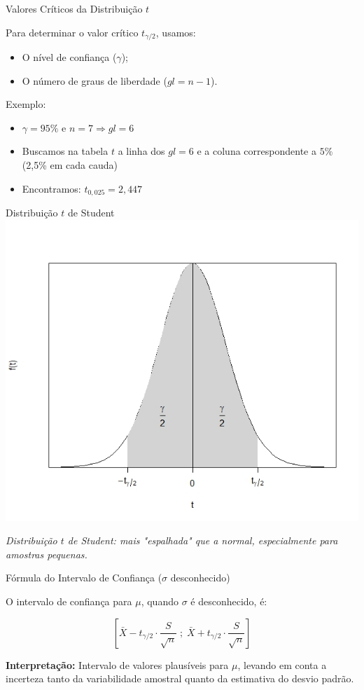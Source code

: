 \documentclass[14pt,aspectratio=1610]{beamer}
\begin{document}
\begin{frame}{Valores Críticos da Distribuição $t$}
	\begin{block}{}
		\justifying
		Para determinar o valor crítico $t_{\gamma/2}$, usamos:
		\begin{itemize}
			\item O nível de confiança ($\gamma$);
			\item O número de graus de liberdade ($gl = n - 1$).
		\end{itemize}
		
		Exemplo:
		\begin{itemize}
			\item $\gamma = 95\%$ e $n = 7 \Rightarrow gl = 6$
			\item Buscamos na tabela $t$ a linha dos $gl = 6$ e a coluna correspondente a $5\%$ (2,5\% em cada cauda)
			\item Encontramos: $t_{0,025} = 2,447$
		\end{itemize}
	\end{block}
\end{frame}

\begin{frame}{Distribuição $t$ de Student}
	\centering
	\includegraphics[width=0.5\linewidth]{figs/ICtStudent.jpeg}
	
	\vspace{-0.3cm}
	\small\textit{Distribuição $t$ de Student: mais "espalhada" que a normal, especialmente para amostras pequenas.}
\end{frame}

\begin{frame}{Fórmula do Intervalo de Confiança ($\sigma$ desconhecido)}
	\begin{block}{}
		\justifying
		O intervalo de confiança para $\mu$, quando $\sigma$ é desconhecido, é:
		
		\[
		\left[ \bar{X} - t_{\gamma/2} \cdot \frac{S}{\sqrt{n}} \; ; \;
		\bar{X} + t_{\gamma/2} \cdot \frac{S}{\sqrt{n}} \right]
		\]
		
		\textbf{Interpretação:} Intervalo de valores plausíveis para $\mu$, levando em conta a incerteza tanto da variabilidade amostral quanto da estimativa do desvio padrão.
	\end{block}
\end{frame}
	
\end{document}
